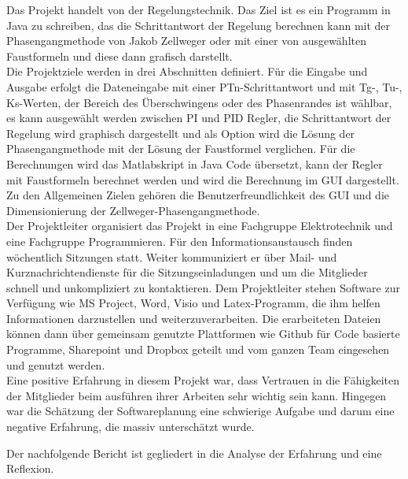 Das Projekt handelt von der Regelungstechnik. Das Ziel ist es ein Programm in Java zu schreiben, das die Schrittantwort der Regelung berechnen kann mit der Phasengangmethode von Jakob Zellweger oder mit einer von ausgewählten Faustformeln und diese dann grafisch darstellt.\\
Die Projektziele werden in drei Abschnitten definiert. Für die Eingabe und Ausgabe erfolgt die Dateneingabe mit einer PTn-Schrittantwort und mit Tg-, Tu-, Ks-Werten, der Bereich des Überschwingens oder des Phasenrandes ist wählbar, es kann ausgewählt werden zwischen PI und PID Regler, die Schrittantwort der Regelung wird graphisch dargestellt und als Option wird die Lösung der Phasengangmethode mit der Lösung der Faustformel verglichen. Für die Berechnungen wird das Matlabskript in Java Code übersetzt, kann der Regler mit Faustformeln berechnet werden und wird die Berechnung im GUI dargestellt. Zu den Allgemeinen Zielen gehören die Benutzerfreundlichkeit des GUI und die Dimensionierung der Zellweger-Phasengangmethode.\\
Der Projektleiter organisiert das Projekt in eine Fachgruppe Elektrotechnik und eine Fachgruppe Programmieren. Für den Informationsaustausch finden wöchentlich Sitzungen statt. Weiter kommuniziert er über Mail- und Kurznachrichtendienste für die Sitzungseinladungen und um die Mitglieder schnell und unkompliziert zu kontaktieren. Dem Projektleiter stehen Software zur Verfügung wie MS Project, Word, Visio und Latex-Programm, die ihm helfen Informationen darzustellen und weiterzuverarbeiten. Die erarbeiteten Dateien können dann über gemeinsam genutzte Plattformen wie Github für Code basierte Programme, Sharepoint und Dropbox geteilt und vom ganzen Team eingesehen und genutzt werden.\\

Eine positive Erfahrung in diesem Projekt war, dass Vertrauen in die Fähigkeiten der Mitglieder beim ausführen ihrer Arbeiten sehr wichtig sein kann. Hingegen war die Schätzung der Softwareplanung eine schwierige Aufgabe und darum eine negative Erfahrung, die massiv unterschätzt wurde.

Der nachfolgende Bericht ist gegliedert in die Analyse der Erfahrung und eine Reflexion.
